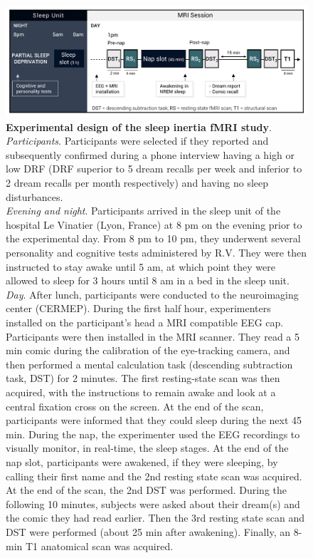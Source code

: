 \begin{figure}[!htbp]
	\includegraphics[width=\textwidth]{Fig/Intro/Intro_paradigm_fMRI/Intro_paradigm_fMRI.png}
	\caption[Experimental design of the fMRI study]{\textbf{Experimental design of the sleep inertia fMRI study}. \\
    \emph{Participants}. Participants were selected if they reported and subsequently confirmed during a phone interview having a high or low DRF (DRF superior to 5 dream recalls per week and inferior to 2 dream recalls per month respectively) and having no sleep disturbances. \\
    \emph{Evening and night}. Participants arrived in the sleep unit of the hospital Le Vinatier (Lyon, France) at 8 pm on the evening prior to the experimental day. From 8 pm to 10 pm, they underwent several personality and cognitive tests administered by R.V. They were then instructed to stay awake until 5 am, at which point they were allowed to sleep for 3 hours until 8 am in a bed in the sleep unit. \\
    \emph{Day}. After lunch, participants were conducted to the neuroimaging center (CERMEP). During the first half hour, experimenters installed on the participant’s head a MRI compatible EEG cap. Participants were then installed in the MRI scanner. They read a 5 min comic during the calibration of the eye-tracking camera, and then performed a mental calculation task (descending subtraction task, DST) for 2 minutes. The first resting-state scan was then acquired, with the instructions to remain awake and look at a central fixation cross on the screen. At the end of the scan, participants were informed that they could sleep during the next 45 min. During the nap, the experimenter used the EEG recordings to visually monitor, in real-time, the sleep stages. At the end of the nap slot, participants were awakened, if they were sleeping, by calling their first name and the 2nd resting state scan was acquired. At the end of the scan, the 2nd DST was performed. During the following 10 minutes, subjects were asked about their dream(s) and the comic they had read earlier. Then the 3rd resting state scan and DST were performed (about 25 min after awakening). Finally, an 8-min T1 anatomical scan was acquired.}
	\label{fig:intro:problematics-fmri-paradigm}
\end{figure}

